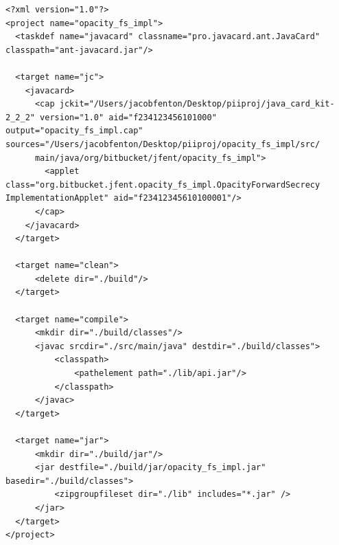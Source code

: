 \documentclass[12pt,a4paper,twoside,openright]{report}
\begin{document}
\begin{verbatim}
<?xml version="1.0"?>
<project name="opacity_fs_impl">
  <taskdef name="javacard" classname="pro.javacard.ant.JavaCard" classpath="ant-javacard.jar"/>

  <target name="jc">
    <javacard>
      <cap jckit="/Users/jacobfenton/Desktop/piiproj/java_card_kit-2_2_2" version="1.0" aid="f234123456101000" output="opacity_fs_impl.cap" sources="/Users/jacobfenton/Desktop/piiproj/opacity_fs_impl/src/
      main/java/org/bitbucket/jfent/opacity_fs_impl">
        <applet class="org.bitbucket.jfent.opacity_fs_impl.OpacityForwardSecrecy ImplementationApplet" aid="f23412345610100001"/>
      </cap>
    </javacard>
  </target>

  <target name="clean">
      <delete dir="./build"/>
  </target>

  <target name="compile">
      <mkdir dir="./build/classes"/>
      <javac srcdir="./src/main/java" destdir="./build/classes">
          <classpath>
              <pathelement path="./lib/api.jar"/>
          </classpath>
      </javac>
  </target>

  <target name="jar">
      <mkdir dir="./build/jar"/>
      <jar destfile="./build/jar/opacity_fs_impl.jar" basedir="./build/classes">
          <zipgroupfileset dir="./lib" includes="*.jar" />
      </jar>
  </target>
</project>
\end{verbatim}
\end{document}
